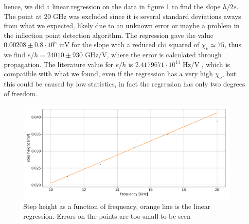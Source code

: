 \documentclass[a4paper,10pt]{article}
\begin{document}
hence, we did a linear regression on the data in figure \ref{eh} to find the slope $h/2e$. The point at 20 GHz was excluded since it is several standard deviations aways from what we expected, likely due to an unknown error or maybe a problem in the inflection point detection algorithm. The regression gave the value $0.00208\pm 0.8\cdot 10^5$ mV for the slope with a reduced chi squared of $\chi_\nu \simeq 75$, thus we find $e/h = 24010 \pm 930$ GHz/V, where the error is calculated through propagation. The literature value for $e/h$ is $ 2.4179671\cdot 10^{14}$ Hz/V \cite{skriptum}, which is compatible with what we found, even if the regression has a very high $\chi_\nu$, but this could be caused by low statistics, in fact the regression has only two degrees of freedom.
\begin{figure}[H]
\centering
\includegraphics[width = \textwidth]{eh}
\caption{Step height as a function of frequency, orange line is the linear regression. Errors on the points are too small to be seen}\label{eh}
\end{figure}
\end{document}
